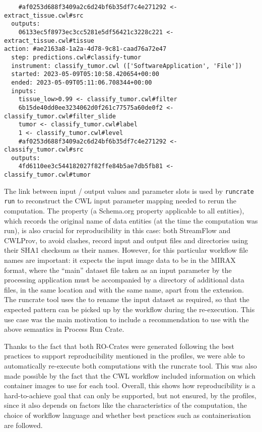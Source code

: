 \begin{lstlisting}
    #af0253d688f3409a2c6d24bf6b35df7c4e271292 <- extract_tissue.cwl#src
  outputs:
    06133ec5f8973ec3cc5281e5df56421c3228c221 <- extract_tissue.cwl#tissue
action: #ae2163a8-1a2a-4d78-9c81-caad76a72e47
  step: predictions.cwl#classify-tumor
  instrument: classify_tumor.cwl (['SoftwareApplication', 'File'])
  started: 2023-05-09T05:10:58.420654+00:00
  ended: 2023-05-09T05:11:06.708344+00:00
  inputs:
    tissue_low>0.99 <- classify_tumor.cwl#filter
    6b15de40dd0ee3234062d0f261c77575a60de0f2 <- classify_tumor.cwl#filter_slide
    tumor <- classify_tumor.cwl#label
    1 <- classify_tumor.cwl#level
    #af0253d688f3409a2c6d24bf6b35df7c4e271292 <- classify_tumor.cwl#src
  outputs:
    4fd6110ee3c544182027f82ffe84b5ae7db5fb81 <- classify_tumor.cwl#tumor
\end{lstlisting}


The  link between input / output values and parameter slots is used by \texttt{runcrate run} to reconstruct the CWL input parameter mapping needed to rerun the computation.
The  property (a Schema.org property applicable to all entities), which records the original name of data entities (at the time the computation was run), is also crucial for reproducibility in this case: both StreamFlow and CWLProv, to avoid clashes, record input and output files and directories using their SHA1
checksum as their names. 
However, for this particular workflow file names are important: it expects the input image data to be in the MIRAX~\cite{mirax-format} format, where the ``main'' dataset file taken as an input parameter by the processing application must be accompanied by a directory of additional data files, in the same location and with the same name, apart from the extension.
The runcrate tool uses the  to rename the input dataset as required, so that the expected pattern can be picked up by the workflow during the re-execution.
This use case was the main motivation to include a recommendation to use  with the above semantics in Process Run Crate.

Thanks to the fact that both RO-Crates were generated following the best practices to support reproducibility mentioned in the profiles, we were able to automatically re-execute both computations with the runcrate tool.
This was also made possible by the fact that the CWL workflow included information on which container images to use for each tool.
Overall, this shows how reproducibility is a hard-to-achieve goal that can only be supported, but not ensured, by the profiles, since it also depends on factors like the characteristics of the computation, the choice of workflow language and whether best practices such as containerisation are followed.

